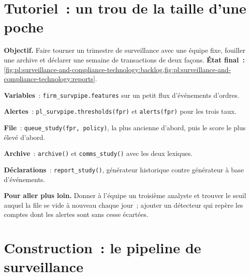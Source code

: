 \section{Tutoriel~: un trou de la taille d'une poche}\label{tut:pl:surveillance-and-compliance-technology:tut}

\begin{tutorial}
\textbf{Objectif.} Faire tourner un trimestre de surveillance avec une équipe fixe, fouiller une archive et déclarer une semaine de transactions de deux façons.
\textbf{État final~:} \cref{fig:pl:surveillance-and-compliance-technology:backlog,fig:pl:surveillance-and-compliance-technology:reports}.
\begin{tutsteps}
\item \textbf{Variables}~: \texttt{firm\_survpipe.features} sur un petit flux d'événements d'ordres.
\item \textbf{Alertes}~: \texttt{pl\_survpipe.thresholds(fpr)} et \texttt{alerts(fpr)} pour les trois taux.
\item \textbf{File}~: \texttt{queue\_study(fpr, policy)}, la plus ancienne d'abord, puis le score le plus élevé d'abord.
\item \textbf{Archive}~: \texttt{archive()} et \texttt{comms\_study()} avec les deux lexiques.
\item \textbf{Déclarations}~: \texttt{report\_study()}, générateur historique contre générateur à base d'événements.
\end{tutsteps}
\textbf{Pour aller plus loin.} Donner à l'équipe un troisième analyste et trouver le seuil auquel la file se vide à nouveau chaque jour~; ajouter un détecteur
qui repère les comptes dont les alertes sont sans cesse écartées.
\end{tutorial}

\section{Construction~: le pipeline de surveillance}\label{bld:pl:surveillance-and-compliance-technology:survpipe}

